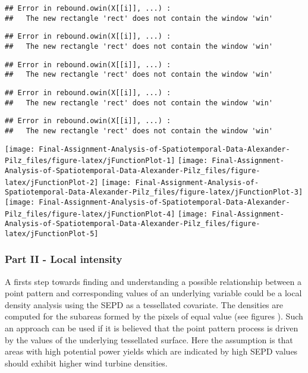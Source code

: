 \documentclass[
]{article}
\begin{document}
\begin{verbatim}
## Error in rebound.owin(X[[i]], ...) : 
##   The new rectangle 'rect' does not contain the window 'win'
\end{verbatim}

\begin{verbatim}
## Error in rebound.owin(X[[i]], ...) : 
##   The new rectangle 'rect' does not contain the window 'win'
\end{verbatim}

\begin{verbatim}
## Error in rebound.owin(X[[i]], ...) : 
##   The new rectangle 'rect' does not contain the window 'win'
\end{verbatim}

\begin{verbatim}
## Error in rebound.owin(X[[i]], ...) : 
##   The new rectangle 'rect' does not contain the window 'win'
\end{verbatim}

\begin{verbatim}
## Error in rebound.owin(X[[i]], ...) : 
##   The new rectangle 'rect' does not contain the window 'win'
\end{verbatim}

\texttt{[image: Final-Assignment-Analysis-of-Spatiotemporal-Data-Alexander-Pilz\_files/figure-latex/jFunctionPlot-1]}
\texttt{[image: Final-Assignment-Analysis-of-Spatiotemporal-Data-Alexander-Pilz\_files/figure-latex/jFunctionPlot-2]}
\texttt{[image: Final-Assignment-Analysis-of-Spatiotemporal-Data-Alexander-Pilz\_files/figure-latex/jFunctionPlot-3]}
\texttt{[image: Final-Assignment-Analysis-of-Spatiotemporal-Data-Alexander-Pilz\_files/figure-latex/jFunctionPlot-4]}
\texttt{[image: Final-Assignment-Analysis-of-Spatiotemporal-Data-Alexander-Pilz\_files/figure-latex/jFunctionPlot-5]}

\hypertarget{part-ii---local-intensity}{%
\subsubsection{Part II - Local
intensity}\label{part-ii---local-intensity}}

A firsts step towards finding and understanding a possible relationship
between a point pattern and corresponding values of an underlying
variable could be a local density analysis using the SEPD as a
tessellated covariate. The densities are computed for the subareas
formed by the pixels of equal value (see figures ). Such an approach can
be used if it is believed that the point pattern process is driven by
the values of the underlying tessellated surface. Here the assumption is
that areas with high potential power yields which are indicated by high
SEPD values should exhibit higher wind turbine densities.
\end{document}
